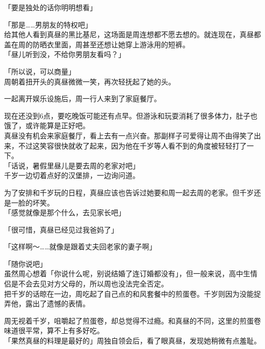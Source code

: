 「要是独处的话你明明想看」

「那是……男朋友的特权吧」\\

给其他人看到真昼的黑比基尼，这场面是周连想都不愿去想的。就连现在，真昼都盖在周的防晒衣里面，周甚至还想让她穿上游泳用的短裤。\\

「昼儿听到没，不给你男朋友看吗？」

「所以说，可以商量」\\

周朝着扭开头的真昼微微一笑，再次轻抚起了她的头。\\

\vspace{2\baselineskip}

一起离开娱乐设施后，周一行人来到了家庭餐厅。

现在还没到6点，要吃晚饭可能还有点早。但游泳和玩耍消耗了很多体力，肚子也饿了，或许能算是正好吧。\\

真昼没有机会来家庭餐厅，看上去有一点兴奋。那副样子可爱得让周不由得笑了出来，不过这笑容很快就收了起来，因为他在千岁等人看不到的角度被轻轻打了一下。\\

「话说，暑假里昼儿是要去周的老家对吧」\\

千岁一边切着点好的汉堡排，一边询问道。

为了安排和千岁玩的日程，真昼应该也告诉过她要和周一起去周的老家。但千岁还是一脸的坏笑。\\

「感觉就像是那个什么，去见家长吧」

「很可惜，真昼已经见过我爸妈了」

「这样啊～……就像是跟着丈夫回老家的妻子啊」

「随你说吧」\\

虽然周心想着「你说什么呢，别说结婚了连订婚都没有」，但一般来说，高中生情侣是不会去见对方父母的，所以周也没法完全否定。\\

把千岁的话晾在一边，周吃起了自己点的和风套餐中的煎蛋卷。千岁则因为没能捉弄他，露出了遗憾的表情。

周无视着千岁，咀嚼起了煎蛋卷，却总觉得不过瘾。和真昼的不同，这里的煎蛋卷味道很平常，算不上有多好吃。\\

「果然真昼的料理是最好的」周独自领会后，看了眼真昼，发现她稍微有点羞耻。

